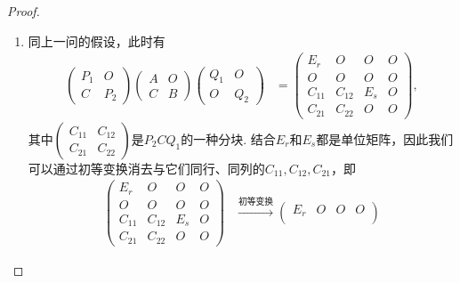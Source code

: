 \begin{enumerate}
\begin{proof}
\begin{enumerate}
                  \item 同上一问的假设，此时有
                        \begin{align*}
                            \begin{pmatrix}
                                P_1 & O \\ C & P_2
                            \end{pmatrix}
                            \begin{pmatrix}
                                A & O \\ C & B
                            \end{pmatrix}
                            \begin{pmatrix}
                                Q_1 & O \\ O & Q_2
                            \end{pmatrix}
                             & =\begin{pmatrix}
                                    E_r & O & O & O \\ O & O & O & O \\ C_{11} & C_{12} & E_s & O \\ C_{21} & C_{22} & O & O
                                \end{pmatrix},
                        \end{align*}
                        其中$\begin{pmatrix}
                                C_{11} & C_{12} \\ C_{21} & C_{22}
                            \end{pmatrix}$是$P_2CQ_1$的一种分块. 结合$E_r$和$E_s$都是单位矩阵，因此我们可以通过初等变换消去与它们同行、同列的$C_{11},C_{12},C_{21}$，即
                        \begin{align*}
                            \begin{pmatrix}
                                E_r    & O      & O   & O \\
                                O      & O      & O   & O \\
                                C_{11} & C_{12} & E_s & O \\
                                C_{21} & C_{22} & O   & O
                            \end{pmatrix}
                             & \xrightarrow{\text{初等变换}}\begin{pmatrix}
                                                                E_r & O      & O & O \\

\end{pmatrix}
\end{align*}
\end{enumerate}
\end{proof}
\end{enumerate}
